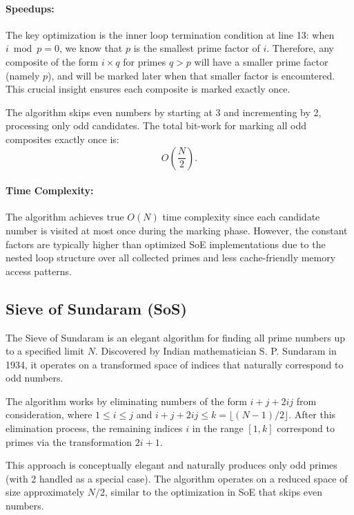 \documentclass{article}
\begin{document}
\paragraph{Speedups:}
The key optimization is the inner loop termination condition at line 13: when $i \bmod p = 0$, we know that $p$ is the smallest prime factor of $i$. Therefore, any composite of the form $i \times q$ for primes $q > p$ will have a smaller prime factor (namely $p$), and will be marked later when that smaller factor is encountered. This crucial insight ensures each composite is marked exactly once.

The algorithm skips even numbers by starting at 3 and incrementing by 2, processing only odd candidates. The total bit-work for marking all odd composites exactly once is:
\[
O\left(\frac{N}{2}\right).
\]

\paragraph{Time Complexity:} The algorithm achieves true $O(N)$ time complexity since each candidate number is visited at most once during the marking phase. However, the constant factors are typically higher than optimized SoE implementations due to the nested loop structure over all collected primes and less cache-friendly memory access patterns.

\subsection{Sieve of Sundaram (SoS)} \label{alg:sos}

The Sieve of Sundaram is an elegant algorithm for finding all prime numbers up to a specified limit $N$. Discovered by Indian mathematician S. P. Sundaram in 1934, it operates on a transformed space of indices that naturally correspond to odd numbers.

The algorithm works by eliminating numbers of the form $i + j + 2ij$ from consideration, where $1 \le i \le j$ and $i + j + 2ij \le k = \lfloor(N-1)/2\rfloor$. After this elimination process, the remaining indices $i$ in the range $[1, k]$ correspond to primes via the transformation $2i + 1$.

This approach is conceptually elegant and naturally produces only odd primes (with 2 handled as a special case). The algorithm operates on a reduced space of size approximately $N/2$, similar to the optimization in SoE that skips even numbers.
\end{document}
